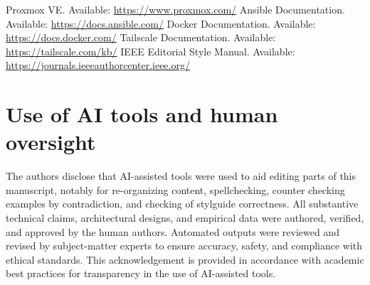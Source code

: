 \documentclass[11pt]{article}
\begin{document}

\begin{thebibliography}{99}
 Proxmox VE. Available: \url{https://www.proxmox.com/}
 Ansible Documentation. Available: \url{https://docs.ansible.com/}
 Docker Documentation. Available: \url{https://docs.docker.com/}
 Tailscale Documentation. Available: \url{https://tailscale.com/kb/}
 IEEE Editorial Style Manual. Available: \url{https://journals.ieeeauthorcenter.ieee.org/}
\end{thebibliography}


\section*{Use of AI tools and human oversight}
The authors disclose that AI-assisted tools were used to aid editing parts of this manuscript, notably for re-organizing content, spellchecking, counter checking examples by contradiction, and checking of stylguide correctness.
All substantive technical claims, architectural designs, and empirical data were authored, verified, and approved by the human authors.
Automated outputs were reviewed and revised by subject-matter experts to ensure accuracy, safety, and compliance with ethical standards.
This acknowledgement is provided in accordance with academic best practices for transparency in the use of AI-assisted tools.
\end{document}
